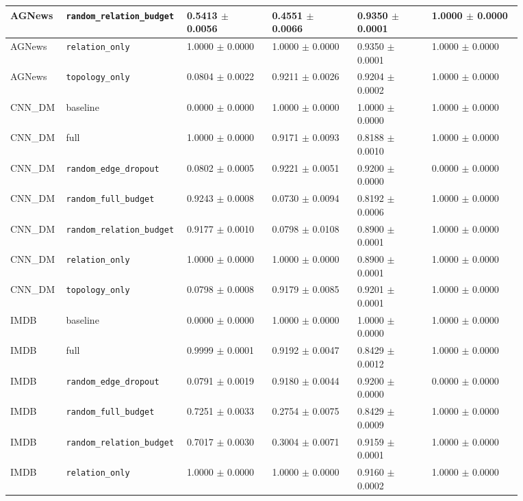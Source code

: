 \documentclass[preprint,12pt]{elsarticle}
\begin{document}
\begin{landscape}
\begin{longtable}{|L{0.08\linewidth}|L{0.16\linewidth}|C{0.16\linewidth}|C{0.16\linewidth}|C{0.14\linewidth}|C{0.17\linewidth}|}
AGNews & \nolinkurl{random_relation_budget} & 0.5413 $\pm$ 0.0056 & 0.4551 $\pm$ 0.0066 & 0.9350 $\pm$ 0.0001 & 1.0000 $\pm$ 0.0000 \\ \hline
AGNews & \nolinkurl{relation_only} & 1.0000 $\pm$ 0.0000 & 1.0000 $\pm$ 0.0000 & 0.9350 $\pm$ 0.0001 & 1.0000 $\pm$ 0.0000 \\ \hline
AGNews & \nolinkurl{topology_only} & 0.0804 $\pm$ 0.0022 & 0.9211 $\pm$ 0.0026 & 0.9204 $\pm$ 0.0002 & 1.0000 $\pm$ 0.0000 \\ \hline
CNN\_DM & baseline & 0.0000 $\pm$ 0.0000 & 1.0000 $\pm$ 0.0000 & 1.0000 $\pm$ 0.0000 & 1.0000 $\pm$ 0.0000 \\ \hline
CNN\_DM & full & 1.0000 $\pm$ 0.0000 & 0.9171 $\pm$ 0.0093 & 0.8188 $\pm$ 0.0010 & 1.0000 $\pm$ 0.0000 \\ \hline
CNN\_DM & \nolinkurl{random_edge_dropout} & 0.0802 $\pm$ 0.0005 & 0.9221 $\pm$ 0.0051 & 0.9200 $\pm$ 0.0000 & 0.0000 $\pm$ 0.0000 \\ \hline
CNN\_DM & \nolinkurl{random_full_budget} & 0.9243 $\pm$ 0.0008 & 0.0730 $\pm$ 0.0094 & 0.8192 $\pm$ 0.0006 & 1.0000 $\pm$ 0.0000 \\ \hline
CNN\_DM & \nolinkurl{random_relation_budget} & 0.9177 $\pm$ 0.0010 & 0.0798 $\pm$ 0.0108 & 0.8900 $\pm$ 0.0001 & 1.0000 $\pm$ 0.0000 \\ \hline
CNN\_DM & \nolinkurl{relation_only} & 1.0000 $\pm$ 0.0000 & 1.0000 $\pm$ 0.0000 & 0.8900 $\pm$ 0.0001 & 1.0000 $\pm$ 0.0000 \\ \hline
CNN\_DM & \nolinkurl{topology_only} & 0.0798 $\pm$ 0.0008 & 0.9179 $\pm$ 0.0085 & 0.9201 $\pm$ 0.0001 & 1.0000 $\pm$ 0.0000 \\ \hline
IMDB & baseline & 0.0000 $\pm$ 0.0000 & 1.0000 $\pm$ 0.0000 & 1.0000 $\pm$ 0.0000 & 1.0000 $\pm$ 0.0000 \\ \hline
IMDB & full & 0.9999 $\pm$ 0.0001 & 0.9192 $\pm$ 0.0047 & 0.8429 $\pm$ 0.0012 & 1.0000 $\pm$ 0.0000 \\ \hline
IMDB & \nolinkurl{random_edge_dropout} & 0.0791 $\pm$ 0.0019 & 0.9180 $\pm$ 0.0044 & 0.9200 $\pm$ 0.0000 & 0.0000 $\pm$ 0.0000 \\ \hline
IMDB & \nolinkurl{random_full_budget} & 0.7251 $\pm$ 0.0033 & 0.2754 $\pm$ 0.0075 & 0.8429 $\pm$ 0.0009 & 1.0000 $\pm$ 0.0000 \\ \hline
IMDB & \nolinkurl{random_relation_budget} & 0.7017 $\pm$ 0.0030 & 0.3004 $\pm$ 0.0071 & 0.9159 $\pm$ 0.0001 & 1.0000 $\pm$ 0.0000 \\ \hline
IMDB & \nolinkurl{relation_only} & 1.0000 $\pm$ 0.0000 & 1.0000 $\pm$ 0.0000 & 0.9160 $\pm$ 0.0002 & 1.0000 $\pm$ 0.0000 \\ \hline

\end{longtable}
\end{landscape}
\end{document}
